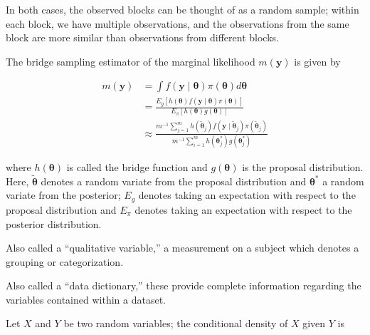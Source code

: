 \documentclass[
  letterpaper,
  DIV=11,
  numbers=noendperiod]{scrreprt}
\providecommand{\tightlist}{%
  \setlength{\itemsep}{0pt}\setlength{\parskip}{0pt}}\usepackage{longtable,booktabs,array}
\theoremstyle{definition}
\theoremstyle{plain}
\theoremstyle{definition}
\theoremstyle{remark}
\begin{document}
In both cases, the observed blocks can be thought of as a random sample;
within each block, we have multiple observations, and the observations
from the same block are more similar than observations from different
blocks.

\begin{description}
\tightlist
\item[Bridge Sampling (Definition~\ref{def-bridge-sampling})]
The bridge sampling estimator of the marginal likelihood
\(m(\mathbf{y})\) is given by
\end{description}

\[
\begin{aligned}
  m(\mathbf{y}) 
    &= \int f(\mathbf{y} \mid \boldsymbol{\theta}) \pi(\boldsymbol{\theta}) d\boldsymbol{\theta} \\
    &= \frac{E_g\left[h(\boldsymbol{\theta}) f(\mathbf{y} \mid \boldsymbol{\theta}) \pi(\boldsymbol{\theta})\right]}{E_{\pi}\left[h(\boldsymbol{\theta}) g(\boldsymbol{\theta}) \right]} \\
    &\approx \frac{m^{-1}\sum_{j=1}^{m} h\left(\tilde{\boldsymbol{\theta}}_j\right) f\left(\mathbf{y} \mid \tilde{\boldsymbol{\theta}}_j\right) \pi\left(\tilde{\boldsymbol{\theta}}_j\right)}{m^{-1}\sum_{i=1}^{m} h\left(\boldsymbol{\theta}^*_j\right) g\left(\boldsymbol{\theta}^*_j\right)}
\end{aligned}
\]

where \(h(\boldsymbol{\theta})\) is called the bridge function and
\(g(\boldsymbol{\theta})\) is the proposal distribution. Here,
\(\tilde{\boldsymbol{\theta}}\) denotes a random variate from the
proposal distribution and \(\boldsymbol{\theta}^*\) a random variate
from the posterior; \(E_g\) denotes taking an expectation with respect
to the proposal distribution and \(E_\pi\) denotes taking an expectation
with respect to the posterior distribution.

\begin{description}
\tightlist
\item[Categorical Variable (Definition~\ref{def-categorical})]
Also called a ``qualitative variable,'' a measurement on a subject which
denotes a grouping or categorization.
\item[Codebook (Definition~\ref{def-codebook})]
Also called a ``data dictionary,'' these provide complete information
regarding the variables contained within a dataset.
\item[Conditional Density (Definition~\ref{def-conditional-density})]
Let \(X\) and \(Y\) be two random variables; the conditional density of
\(X\) given \(Y\) is
\end{description}
\end{document}
